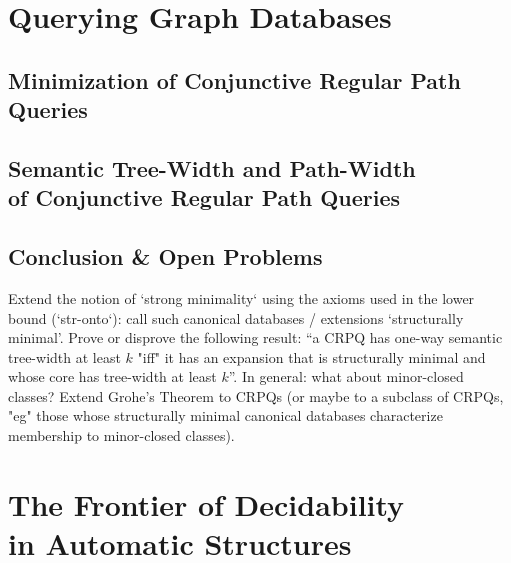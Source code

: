 \documentclass[a4paper,sfsidenotes,twoside,justified,nobib]{tufte-book-custom}
\begin{document}




\part{Querying Graph Databases}



\chapter{Minimization of Conjunctive Regular Path Queries}

\chapter[{Semantic Tree-Width and Path-Width of Conjunctive Regular Path Queries}]{Semantic Tree-Width and Path-Width\\of Conjunctive Regular Path Queries}


\chapter{Conclusion \& Open Problems}

Extend the notion of `strong minimality` using the axioms used in the lower bound (`str-onto`): call such canonical databases / extensions `structurally minimal'.
Prove or disprove the following result: ``a CRPQ has one-way semantic tree-width at least $k$ "iff" it has an expansion that is structurally minimal and whose core has tree-width at least $k$''. In general: what about minor-closed classes?
Extend Grohe's Theorem to CRPQs (or maybe to a subclass of CRPQs, "eg" those whose
structurally minimal canonical databases characterize membership to minor-closed classes).

\part[The Frontier of Decidability in Automatic Structures]{The Frontier of Decidability\\in Automatic Structures}
\end{document}
